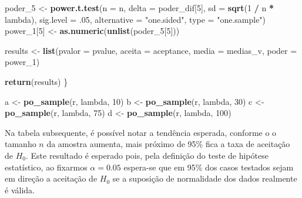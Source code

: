 \documentclass[11pt,]{article}
\newenvironment{Shaded}{\begin{snugshade}}{\end{snugshade}}
\newcommand{\DataTypeTok}[1]{\textcolor[rgb]{0.13,0.29,0.53}{#1}}
\newcommand{\DecValTok}[1]{\textcolor[rgb]{0.00,0.00,0.81}{#1}}
\newcommand{\FloatTok}[1]{\textcolor[rgb]{0.00,0.00,0.81}{#1}}
\newcommand{\KeywordTok}[1]{\textcolor[rgb]{0.13,0.29,0.53}{\textbf{#1}}}
\newcommand{\NormalTok}[1]{#1}
\newcommand{\OperatorTok}[1]{\textcolor[rgb]{0.81,0.36,0.00}{\textbf{#1}}}
\newcommand{\StringTok}[1]{\textcolor[rgb]{0.31,0.60,0.02}{#1}}
\begin{document}
\begin{Shaded}
\begin{Highlighting}[]
\NormalTok{  poder_}\DecValTok{5}\NormalTok{ <-}\StringTok{ }\KeywordTok{power.t.test}\NormalTok{(}\DataTypeTok{n =}\NormalTok{ n, }\DataTypeTok{delta =}\NormalTok{ poder_dif[}\DecValTok{5}\NormalTok{],}
                          \DataTypeTok{sd =} \KeywordTok{sqrt}\NormalTok{(}\DecValTok{1} \OperatorTok{/}\StringTok{ }\NormalTok{n }\OperatorTok{*}\StringTok{ }\NormalTok{lambda),}
                          \DataTypeTok{sig.level =} \FloatTok{.05}\NormalTok{,}
                          \DataTypeTok{alternative =} \StringTok{"one.sided"}\NormalTok{,}
                          \DataTypeTok{type =} \StringTok{"one.sample"}\NormalTok{)}
\NormalTok{  power_}\DecValTok{1}\NormalTok{[}\DecValTok{5}\NormalTok{] <-}\StringTok{ }\KeywordTok{as.numeric}\NormalTok{(}\KeywordTok{unlist}\NormalTok{(poder_}\DecValTok{5}\NormalTok{[}\DecValTok{5}\NormalTok{]))}

\NormalTok{  results <-}\StringTok{ }\KeywordTok{list}\NormalTok{(}\DataTypeTok{pvalor =}\NormalTok{ pvalue, }\DataTypeTok{aceita =}\NormalTok{ aceptance,}
                  \DataTypeTok{media =}\NormalTok{ medias_v, }\DataTypeTok{poder =}\NormalTok{ power_}\DecValTok{1}\NormalTok{)}

  \KeywordTok{return}\NormalTok{(results)}
\NormalTok{\}}

\NormalTok{a <-}\StringTok{ }\KeywordTok{po_sample}\NormalTok{(r, lambda, }\DecValTok{10}\NormalTok{)}
\NormalTok{b <-}\StringTok{ }\KeywordTok{po_sample}\NormalTok{(r, lambda, }\DecValTok{30}\NormalTok{)}
\NormalTok{c <-}\StringTok{ }\KeywordTok{po_sample}\NormalTok{(r, lambda, }\DecValTok{75}\NormalTok{)}
\NormalTok{d <-}\StringTok{ }\KeywordTok{po_sample}\NormalTok{(r, lambda, }\DecValTok{100}\NormalTok{)}
\end{Highlighting}
\end{Shaded}

Na tabela subsequente, é possível notar a tendência esperada, conforme o
o tamanho \(n\) da amostra aumenta, mais próximo de 95\% fica a taxa de
aceitação de \(H_0\). Este resultado é esperado pois, pela definição do
teste de hipótese estatístico, ao fixarmos \(\alpha = 0.05\) espera-se
que em 95\% dos casos testados sejam em direção a aceitação de \(H_0\)
se a suposição de normalidade dos dados realmente é válida.
\end{document}
